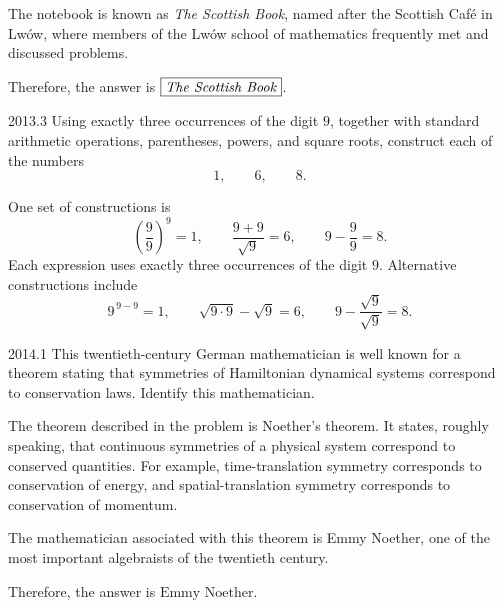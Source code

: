     \begin{solution}
        The notebook is known as \emph{The Scottish Book}, named after the Scottish Café in Lw\'ow,
        where members of the Lw\'ow school of mathematics frequently met and discussed problems.

        Therefore, the answer is $\boxed{\text{\emph{The Scottish Book}}}$.
    \end{solution}

    \begin{pastproblem}{2013.3}
        Using exactly three occurrences of the digit $9$, together with standard arithmetic
        operations, parentheses, powers, and square roots, construct each of the numbers
        \[
            1,\qquad 6,\qquad 8.
        \]
    \end{pastproblem}

    \begin{solution}
        One set of constructions is
        \[
            \left(\frac{9}{9}\right)^9=1,
            \qquad
            \frac{9+9}{\sqrt9}=6,
            \qquad
            9-\frac{9}{9}=8.
        \]
        Each expression uses exactly three occurrences of the digit $9$. Alternative constructions
        include
        \[
            9^{\,9-9}=1,
            \qquad
            \sqrt{9\cdot9}-\sqrt9=6,
            \qquad
            9-\frac{\sqrt9}{\sqrt9}=8.
        \]
    \end{solution}

    \begin{pastproblem}{2014.1}
        This twentieth-century German mathematician is well known for a theorem stating that
        symmetries of Hamiltonian dynamical systems correspond to conservation laws. Identify this
        mathematician.
    \end{pastproblem}

    \begin{solution}
        The theorem described in the problem is Noether's theorem. It states, roughly speaking, that
        continuous symmetries of a physical system correspond to conserved quantities. For example,
        time-translation symmetry corresponds to conservation of energy, and spatial-translation
        symmetry corresponds to conservation of momentum.

        The mathematician associated with this theorem is Emmy Noether, one of the most important
        algebraists of the twentieth century.

        Therefore, the answer is $\boxed{\text{Emmy Noether}}$.
    \end{solution}


